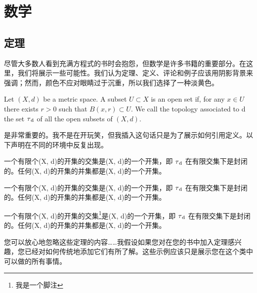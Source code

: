 \setchapterpreamble[u]{\margintoc}
\chapter{数学}

\section{定理}

尽管大多数人看到充满方程式的书时会抱怨，但数学是许多书籍的重要部分。在这里，我们将展示一些可能性。我们认为定理、定义、评论和例子应该用阴影背景来强调；然而，颜色不应对眼睛过于沉重，所以我们选择了一种淡黄色。

\begin{Definition}
	Let $(X, d)$ be a metric space. A subset $U \subset X$ is an open set
	if, for any $x \in U$ there exists $r > 0$ such that $B(x, r) \subset
		U$. We call the topology associated to d the set $\tau\textsubscript{d}$
	of all the open subsets of $(X, d).$
\end{Definition}

 是非常重要的。我不是在开玩笑，但我插入这句话只是为了展示如何引用定义。以下声明在不同的环境中反复出现。

\begin{Theorem}
	一个有限个(X, d)的开集的交集是(X, d)的一个开集，即 $\tau\textsubscript{d}$ 在有限交集下是封闭的。任何(X, d)的开集的并集都是(X, d)的一个开集。
\end{Theorem}

\begin{Proposition}
	一个有限个(X, d)的开集的交集是(X, d)的一个开集，即 $\tau\textsubscript{d}$ 在有限交集下是封闭的。任何(X, d)的开集的并集都是(X, d)的一个开集。
\end{Proposition}


\begin{Lemma}
	一个有限个(X, d)的开集的交集\footnote{我是一个脚注}是(X, d)的一个开集，即 $\tau\textsubscript{d}$ 在有限交集下是封闭的。任何(X, d)的开集的并集都是(X, d)的一个开集。
\end{Lemma}

您可以放心地忽略这些定理的内容……我假设如果您对在您的书中加入定理感兴趣，您已经对如何传统地添加它们有所了解。这些示例应该只是展示您在这个类中可以做的所有事情。


